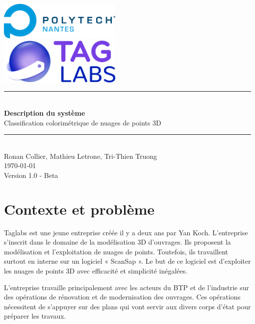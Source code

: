 \documentclass[12pt,titlepage,french]{article}
\begin{document}
\begin{titlepage}
\newcommand{\HRule}{\rule{\linewidth}{0.5mm}}
\center

  \includegraphics[width=0.45\textwidth]{../ressources/img_logos/logo_polytech.png}\\[1cm]

  \includegraphics[width=0.45\textwidth]{../ressources/img_logos/logo_taglabs.png}


\HRule \\[0.4cm]
{ \huge \bfseries Description du système \\[0.15cm] }
Classification colorimétrique de nuages de points 3D
\HRule \\[1.5cm]
Ronan Collier,
Mathieu Letrone,
Tri-Thien Truong
\\[1cm]
\today \\ [1cm]
Version 1.0 - Beta
\end{titlepage}

\tableofcontents %
\newpage
\listoffigures  %
\newpage
\section{Contexte et problème}

Taglabs est une jeune entreprise créée il y a deux ans par Yan Koch. L’entreprise s’inscrit dans le domaine de la modélisation 3D d’ouvrages. Ils proposent la modélisation et l’exploitation de nuages de points. Toutefois, ils travaillent surtout en interne sur un logiciel « ScanSap ». Le but de ce logiciel est d’exploiter les nuages de points 3D avec efficacité et simplicité inégalées. \newline

L’entreprise travaille principalement avec les acteurs du BTP et de l’industrie sur des opérations de rénovation et de modernisation des ouvrages. Ces opérations nécessitent de s’appuyer sur des plans qui vont servir aux divers corps d’état pour préparer les travaux.\newline
\end{document}
